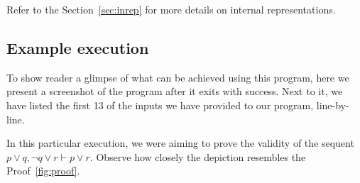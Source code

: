 \documentclass[12pt]{article}
\newcommand{\seq}{\ensuremath{\vdash}}
\begin{document}
Refer to the Section~\ref{sec:inrep} for more details on internal
representations.

\subsection{Example execution}

To show reader a glimpse of what can be achieved using
this program, here we present a screenshot of the program
after it exits with success. Next to it, we have listed the
first 13 of the inputs we have provided to our program,
line-by-line.

In this particular execution, we were aiming to prove the
validity of the sequent $p \lor q, \neg q \lor r \seq p \lor r$.
Observe how closely the depiction resembles the
Proof~\ref{fig:proof}.
\end{document}
